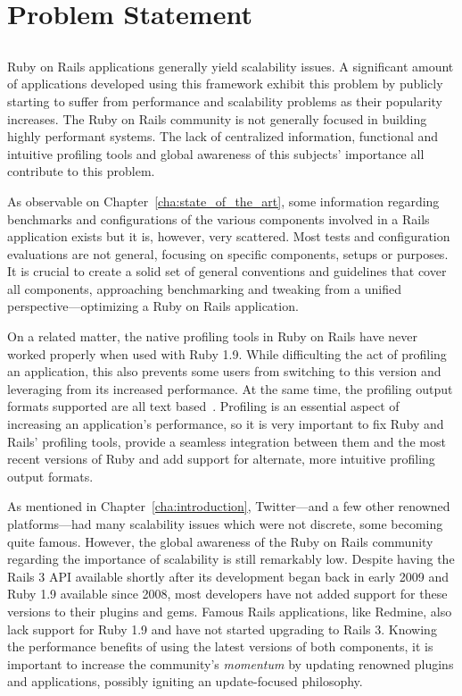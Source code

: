 \chapter{Problem Statement} %
\label{cha:problem_statement}

\section*{} %
Ruby on Rails applications generally yield scalability issues. A significant amount of applications developed using this framework exhibit this problem by publicly starting to suffer from performance and scalability problems as their popularity increases. The Ruby on Rails community is not generally focused in building highly performant systems. The lack of centralized information, functional and intuitive profiling tools and global awareness of this subjects' importance all contribute to this problem.

As observable on Chapter~\ref{cha:state_of_the_art}, some information regarding benchmarks and configurations of the various components involved in a Rails application exists but it is, however, very scattered. Most tests and configuration evaluations are not general, focusing on specific components, setups or purposes. It is crucial to create a solid set of general conventions and guidelines that cover all components, approaching benchmarking and tweaking from a unified perspective---optimizing a Ruby on Rails application.

On a related matter, the native profiling tools in Ruby on Rails have never worked properly when used with Ruby 1.9. While difficulting the act of profiling an application, this also prevents some users from switching to this version and leveraging from its increased performance. At the same time, the profiling output formats supported are all text based~\cite{testing_performance_old}. Profiling is an essential aspect of increasing an application's performance, so it is very important to fix Ruby and Rails' profiling tools, provide a seamless integration between them and the most recent versions of Ruby and add support for alternate, more intuitive profiling output formats.

As mentioned in Chapter~\ref{cha:introduction}, Twitter---and a few other renowned platforms---had many scalability issues which were not discrete, some becoming quite famous. However, the global awareness of the Ruby on Rails community regarding the importance of scalability is still remarkably low. Despite having the Rails 3 API available shortly after its development began back in early 2009 and Ruby 1.9 available since 2008, most developers have not added support for these versions to their plugins and gems. Famous Rails applications, like Redmine, also lack support for Ruby 1.9 and have not started upgrading to Rails 3. Knowing the performance benefits of using the latest versions of both components, it is important to increase the community's \textit{momentum} by updating renowned plugins and applications, possibly igniting an update-focused philosophy.

